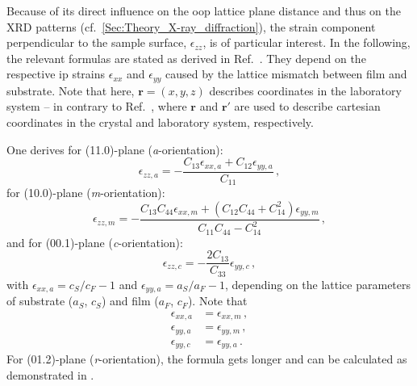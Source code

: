 Because of its direct influence on the \gls{oop} lattice plane distance and thus on the \gls{XRD} patterns (cf.~\ref{Sec:Theory_X-ray_diffraction}), the strain component perpendicular to the sample surface, $\epsilon_{zz}$, is of particular interest. %
In the following, the relevant formulas are stated as derived in Ref.~\cite{grundmann2018}.
They depend on the respective \gls{ip} strains $\epsilon_{xx}$ and $\epsilon_{yy}$ caused by the lattice mismatch between film and substrate.
Note that here, $\mathbf{r}=(x,y,z)$ describes coordinates in the laboratory system -- in contrary to Ref.~\cite{grundmann2018}, where $\mathbf{r}$ and $\mathbf{r}'$ are used to describe cartesian coordinates in the crystal and laboratory system, respectively.

One derives for (11.0)-plane (\textit{a}-orientation):
\begin{equation}
    \label{euq:e3-a}
    \epsilon_{zz,a}=-\frac{C_{13}\epsilon_{xx,a}+C_{12}\epsilon_{yy,a}}{C_{11}} \,,
\end{equation}
for (10.0)-plane (\textit{m}-orientation):
\begin{equation}
    \label{euq:e3-m}
    \epsilon_{zz,m}=-\frac{C_{13}C_{44}\epsilon_{xx,m}+(C_{12}C_{44}+C_{14}^2)\epsilon_{yy,m}}{C_{11}C_{44}-C_{14}^2} \,,
\end{equation}
and for (00.1)-plane (\textit{c}-orientation):
\begin{equation}
    \label{euq:e3-c}
    \epsilon_{zz,c}=-\frac{2C_{13}}{C_{33}}\epsilon_{yy,c} \,,
\end{equation}
with $\epsilon_{xx,a}=c_S/c_F-1$ and $\epsilon_{yy,a}=a_S/a_F-1$, depending on the lattice parameters of substrate ($a_S$, $c_S$) and film ($a_F$, $c_F$).
Note that 
\begin{align*}
    \epsilon_{xx,a}&= \epsilon_{xx,m}\,,\\
    \epsilon_{yy,a}&= \epsilon_{yy,m}\,,\\
    \epsilon_{yy,c}&= \epsilon_{yy,a}\,.
\end{align*}
For (01.2)-plane (\textit{r}-orientation), the formula gets longer and can be calculated as demonstrated in \textcite{grundmann2020}.
